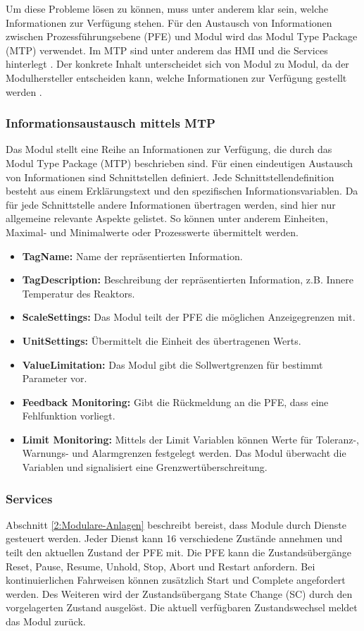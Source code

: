 Um diese Probleme lösen zu können, muss unter anderem klar sein, welche Informationen zur Verfügung stehen. Für den Austausch von Informationen zwischen Prozessführungsebene (PFE) und Modul wird das Modul Type Package (MTP) verwendet. Im MTP sind unter anderem das HMI und die Services hinterlegt \cite{VDI2658-Blatt1}. Der konkrete Inhalt unterscheidet sich von Modul zu Modul, da der Modulhersteller entscheiden kann, welche Informationen zur Verfügung gestellt werden .

\subsubsection*{Informationsaustausch mittels MTP}
Das Modul stellt eine Reihe an Informationen zur Verfügung, die durch das Modul Type Package (MTP) beschrieben sind. Für einen eindeutigen Austausch von Informationen sind Schnittstellen definiert. Jede Schnittstellendefinition besteht aus einem Erklärungstext und den spezifischen Informationsvariablen. Da für jede Schnittstelle andere Informationen übertragen werden, sind hier nur allgemeine relevante Aspekte gelistet. So können unter anderem Einheiten, Maximal- und Minimalwerte oder Prozesswerte übermittelt werden. \cite{VDI2658-Blatt3} 
\begin{itemize}
\item \textbf{TagName:} Name der repräsentierten Information. 
\item \textbf{TagDescription:} Beschreibung der repräsentierten Information, z.B. Innere Temperatur des Reaktors.
\item \textbf{ScaleSettings:} Das Modul teilt der PFE die möglichen Anzeigegrenzen mit.
\item \textbf{UnitSettings:} Übermittelt die Einheit des übertragenen Werts.
\item \textbf{ValueLimitation:} Das Modul gibt die Sollwertgrenzen für bestimmt Parameter vor.
\item \textbf{Feedback Monitoring:} Gibt die Rückmeldung an die PFE, dass eine Fehlfunktion vorliegt.
\item \textbf{Limit Monitoring:} Mittels der Limit Variablen können Werte für Toleranz-, Warnungs- und Alarmgrenzen festgelegt werden. Das Modul überwacht die Variablen und signalisiert eine Grenzwertüberschreitung.
\end{itemize}

\subsubsection*{Services}
 Abschnitt \ref{2:Modulare-Anlagen} beschreibt bereist, dass Module durch Dienste gesteuert werden. Jeder Dienst kann 16 verschiedene Zustände annehmen und teilt den aktuellen Zustand der PFE mit. Die PFE kann die Zustandsübergänge Reset, Pause, Resume, Unhold, Stop, Abort und Restart anfordern. Bei kontinuierlichen Fahrweisen können zusätzlich Start und Complete angefordert werden. Des Weiteren wird der Zustandsübergang State Change (SC) durch den vorgelagerten Zustand ausgelöst. Die aktuell verfügbaren Zustandswechsel meldet das Modul zurück.

